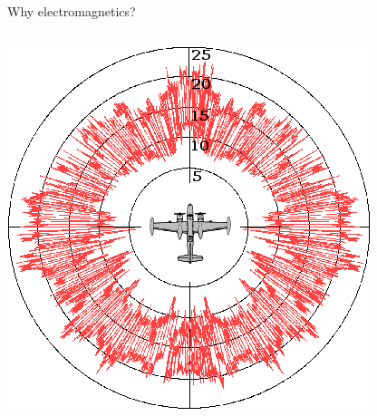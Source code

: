 \documentclass[aspectratio=169, usenames, dvipsnames]{beamer}
\begin{document}
\begin{frame}{Why electromagnetics?}
\begin{columns}
      \centering
      \includegraphics[width=\textwidth]{figures/Sigma_invader_RCS}
  \end{columns}
\end{frame}
\end{document}
